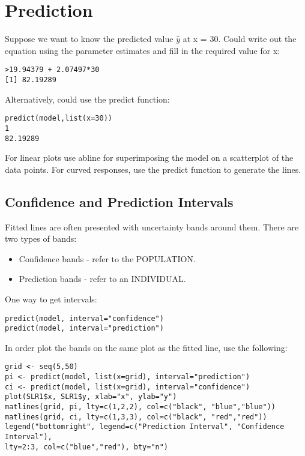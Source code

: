 \documentclass[a4paper,12pt]{article}
\begin{document}
\section{Prediction}
Suppose we want to know the predicted value $\hat{y}$ at x = 30. Could
write out the equation using the parameter estimates and fill in the
required value for x:
\begin{framed}
\begin{verbatim}
>19.94379 + 2.07497*30
[1] 82.19289
\end{verbatim}
\end{framed}
Alternatively, could use the predict function:
\begin{framed}
\begin{verbatim}
predict(model,list(x=30))
1
82.19289
\end{verbatim}
\end{framed}
For linear plots use abline for superimposing the model on a
scatterplot of the data points. For curved responses, use the
predict function to generate the lines.

\subsection{Confidence and Prediction Intervals}
Fitted lines are often presented with uncertainty bands around
them. There are two types of bands:
\begin{itemize}
\item Confidence bands - refer to the POPULATION.
\item Prediction bands - refer to an INDIVIDUAL.
\end{itemize}

One way to get intervals:
\begin{framed}
\begin{verbatim}
predict(model, interval="confidence")
predict(model, interval="prediction")
\end{verbatim}
\end{framed}

In order plot the bands on the same plot as the fitted line, use the
following:
\begin{framed}
\begin{verbatim}
grid <- seq(5,50)
pi <- predict(model, list(x=grid), interval="prediction")
ci <- predict(model, list(x=grid), interval="confidence")
plot(SLR1$x, SLR1$y, xlab="x", ylab="y")
matlines(grid, pi, lty=c(1,2,2), col=c("black", "blue","blue"))
matlines(grid, ci, lty=c(1,3,3), col=c("black", "red","red"))
legend("bottomright", legend=c("Prediction Interval", "Confidence Interval"),
lty=2:3, col=c("blue","red"), bty="n")
\end{verbatim}
\end{framed}
\end{document}
